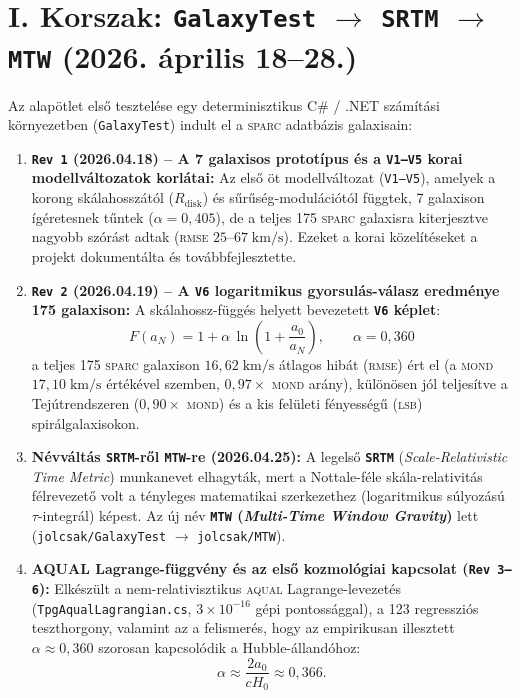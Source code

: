 \documentclass[11pt,a4paper]{article}
\begin{document}
\section{I. Korszak: \texttt{GalaxyTest} $\to$ \texttt{SRTM} $\to$ \texttt{MTW} (2026. április 18--28.)}

Az alapötlet els\H{o} tesztelése egy determinisztikus C\# / .NET számítási környezetben (\texttt{GalaxyTest}) indult el a \textsc{sparc} adatbázis galaxisain:

\begin{enumerate}[leftmargin=1.5em]
\item \textbf{\texttt{Rev 1} (2026.04.18) -- A 7 galaxisos prototípus és a \texttt{V1--V5} korai modellváltozatok korlátai:}
Az els\H{o} öt modellváltozat (\texttt{V1--V5}), amelyek a korong skálahosszától ($R_{\mathrm{disk}}$) és s\H{u}r\H{u}ség-modulációtól függtek, 7 galaxison ígéretesnek t\H{u}ntek ($\alpha = 0{,}405$), de a teljes 175 \textsc{sparc} galaxisra kiterjesztve nagyobb szórást adtak (\textsc{rmse} $25\text{--}67\;\mathrm{km/s}$). Ezeket a korai közelítéseket a projekt dokumentálta és továbbfejlesztette.
\item \textbf{\texttt{Rev 2} (2026.04.19) -- A \texttt{V6} logaritmikus gyorsulás-válasz eredménye 175 galaxison:}
A skálahossz-függés helyett bevezetett \textbf{\texttt{V6} képlet}:
\begin{equation}
F(a_N) = 1 + \alpha\,\ln\!\left(1 + \frac{a_0}{a_N}\right), \qquad \alpha = 0{,}360
\end{equation}
a teljes 175 \textsc{sparc} galaxison $16{,}62\;\mathrm{km/s}$ átlagos hibát (\textsc{rmse}) ért el (a \textsc{mond} $17{,}10\;\mathrm{km/s}$ értékével szemben, $0{,}97\times$ \textsc{mond} arány), különösen jól teljesítve a Tejútrendszeren ($0{,}90\times$ \textsc{mond}) és a kis felületi fényesség\H{u} (\textsc{lsb}) spirálgalaxisokon.
\item \textbf{Névváltás \texttt{SRTM}-r\H{o}l \texttt{MTW}-re (2026.04.25):}
A legels\H{o} \textbf{\texttt{SRTM}} (\emph{Scale-Relativistic Time Metric}) munkanevet elhagyták, mert a Nottale-féle skála-relativitás félrevezet\H{o} volt a tényleges matematikai szerkezethez (logaritmikus súlyozású $\tau$-integrál) képest. Az új név \textbf{\texttt{MTW} (\emph{Multi-Time Window Gravity})} lett (\texttt{jolcsak/GalaxyTest} $\to$ \texttt{jolcsak/MTW}).
\item \textbf{AQUAL Lagrange-függvény és az els\H{o} kozmológiai kapcsolat (\texttt{Rev 3--6}):}
Elkészült a nem-relativisztikus \textsc{aqual} Lagrange-levezetés (\texttt{TpgAqualLagrangian.cs}, $3\times 10^{-16}$ gépi pontossággal), a 123 regressziós teszthorgony, valamint az a felismerés, hogy az empirikusan illesztett $\alpha \approx 0{,}360$ szorosan kapcsolódik a Hubble-állandóhoz:
\begin{equation}
\alpha \approx \frac{2 a_0}{c H_0} \approx 0{,}366.
\end{equation}
\end{enumerate}
\end{document}
